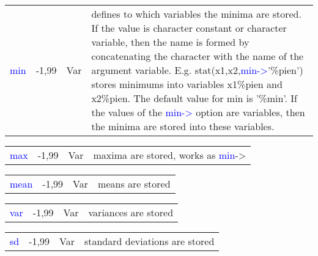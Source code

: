 \vspace{-1.51em}
\begin{table}[H]
\begin{tabular}{ m{}  m{}m{}p{}}
 \textcolor{blue}{min} & -1,99&Var&	defines to which variables the minima are stored.
   If the value is character constant or character variable,
   then the name is formed by concatenating the character with the name of the argument
 variable. E.g. \textcolor{VioletRed}{stat}(x1,x2,\textcolor{blue}{min->}'\%pien') stores minimums into variables
 x1\%pien and x2\%pien. The default value for min  is '\%min'.
If the values of the \textcolor{blue}{min->} option are variables,
 then the minima are stored into these variables.
\\ \cline{1-4}
\end{tabular}
\end{table}
\vspace{-1.51em}
\begin{table}[H]
\begin{tabular}{ m{}  m{}m{}p{}}
 \textcolor{blue}{max} &-1,99&Var& maxima are stored, works as \textcolor{blue}{min}->
\\ \cline{1-4}
\end{tabular}
\end{table}
\vspace{-1.51em}
\begin{table}[H]
\begin{tabular}{ m{}  m{}m{}p{}}
 \textcolor{blue}{mean} &-1,99&Var & means are stored
\\ \cline{1-4}
\end{tabular}
\end{table}
\vspace{-1.51em}
\begin{table}[H]
\begin{tabular}{ m{}  m{}m{}p{}}
 \textcolor{blue}{var} &-1,99&Var& variances are stored
\\ \cline{1-4}
\end{tabular}
\end{table}
\vspace{-1.51em}
\begin{table}[H]
\begin{tabular}{ m{}  m{}m{}p{}}
 \textcolor{blue}{sd} &-1,99&Var& standard deviations are stored
\\ \cline{1-4}
\end{tabular}
\end{table}
